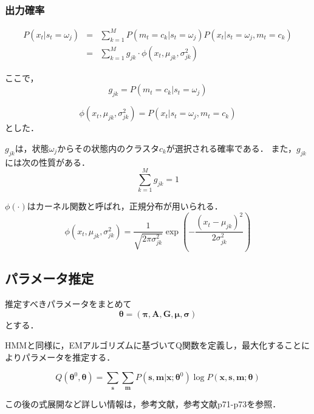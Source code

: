 \subsubsection{出力確率}

\begin{eqnarray}
  P(x_{t} | s_{t} = \omega_{j}) &=& \sum_{k=1}^{M} P(m_{t} = c_{k} | s_{t} = \omega_{j}) P(x_{t} | s_{t} = \omega_{j}, m_{t} = c_{k}) \\
                                &=& \sum_{k=1}^{M} g_{jk} \cdot \phi(x_{t}, \mu_{jk}, \sigma_{jk}^{2})
\end{eqnarray}

ここで，
\begin{equation}
  g_{jk} = P(m_{t} = c_{k} | s_{t} = \omega_{j})
\end{equation}

\begin{equation}
  \phi(x_{t}, \mu_{jk}, \sigma_{jk}^{2}) = P(x_{t} | s_{t} = \omega_{j}, m_{t} = c_{k})
\end{equation}
とした．

$g_{jk}$は，状態$\omega_{j}$からその状態内のクラスタ$c_{k}$が選択される確率である．
また，$g_{jk}$には次の性質がある．
\begin{equation}
  \sum_{k=1}^{M} g_{jk} = 1
\end{equation}

$\phi(\cdot)$はカーネル関数と呼ばれ，正規分布が用いられる．
\begin{equation}
  \phi(x_{t}, \mu_{jk}, \sigma_{jk}^{2}) = \frac{1}{\sqrt{2\pi\sigma_{jk}^{2}}} \exp\left(-\frac{(x_{t} - \mu_{jk})^{2}}{2\sigma_{jk}^{2}}\right)
\end{equation}

\subsection{パラメータ推定}
推定すべきパラメータをまとめて
\begin{equation}
  \bm{\theta} = (\bm{\pi}, \bm{A}, \bm{G}, \bm{\mu}, \bm{\sigma})
\end{equation}
とする．

HMMと同様に，EMアルゴリズムに基づいてQ関数を定義し，最大化することによりパラメータを推定する．

\begin{equation}
  Q(\bm{\theta}^{0}, \bm{\theta}) = \sum_{\mathbf{s}} \sum_{\mathbf{m}} P(\mathbf{s}, \mathbf{m} | \mathbf{x}; \bm{\theta}^{0}) \log P(\mathbf{x}, \mathbf{s}, \mathbf{m}; \bm{\theta})
\end{equation}


この後の式展開など詳しい情報は，参考文献\cite{TutorialHMM}，参考文献\cite{1988確率モデルによる音声認識}p71-p73を参照．
